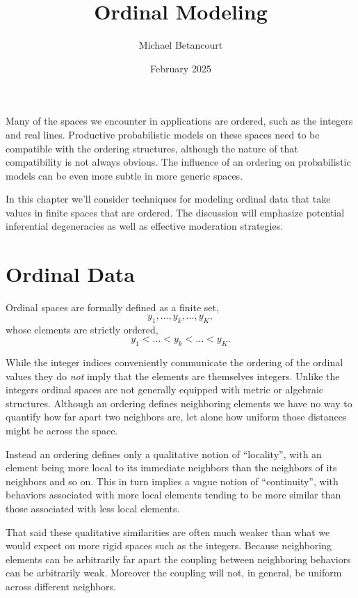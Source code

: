 \documentclass[
  letterpaper,
  DIV=11,
  numbers=noendperiod]{scrartcl}
\title{Ordinal Modeling}
\author{Michael Betancourt}
\date{February 2025}
\renewcommand*\contentsname{Table of contents}
\newcommand\contentsname{Table of contents}
\begin{document}
\maketitle

\renewcommand*\contentsname{Table of contents}
{
\hypersetup{linkcolor=}
\setcounter{tocdepth}{3}
\tableofcontents
}
Many of the spaces we encounter in applications are ordered, such as the
integers and real lines. Productive probabilistic models on these spaces
need to be compatible with the ordering structures, although the nature
of that compatibility is not always obvious. The influence of an
ordering on probabilistic models can be even more subtle in more generic
spaces.

In this chapter we'll consider techniques for modeling ordinal data that
take values in finite spaces that are ordered. The discussion will
emphasize potential inferential degeneracies as well as effective
moderation strategies.

\section{Ordinal Data}\label{ordinal-data}

Ordinal spaces are formally defined as a finite set, \[
y_{1}, \ldots, y_{k}, \ldots, y_{K},
\] whose elements are strictly ordered, \[
y_{1} < \ldots < y_{k} < \ldots < y_{K}.
\]

While the integer indices conveniently communicate the ordering of the
ordinal values they do \emph{not} imply that the elements are themselves
integers. Unlike the integers ordinal spaces are not generally equipped
with metric or algebraic structures. Although an ordering defines
neighboring elements we have no way to quantify how far apart two
neighbors are, let alone how uniform those distances might be across the
space.

Instead an ordering defines only a qualitative notion of ``locality'',
with an element being more local to its immediate neighbors than the
neighbors of its neighbors and so on. This in turn implies a vague
notion of ``continuity'', with behaviors associated with more local
elements tending to be more similar than those associated with less
local elements.

That said these qualitative similarities are often much weaker than what
we would expect on more rigid spaces such as the integers. Because
neighboring elements can be arbitrarily far apart the coupling between
neighboring behaviors can be arbitrarily weak. Moreover the coupling
will not, in general, be uniform across different neighbors.
\end{document}
